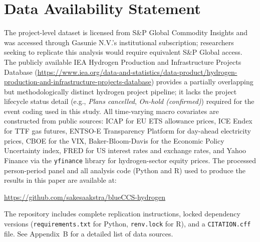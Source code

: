 \documentclass[review,authoryear,11pt]{elsarticle}
\begin{document}
\section*{Data Availability Statement}

The project-level dataset is licensed from S\&P Global Commodity Insights and was accessed through Gasunie N.V.'s institutional subscription; researchers seeking to replicate this analysis would require equivalent S\&P Global access. The publicly available IEA Hydrogen Production and Infrastructure Projects Database (\url{https://www.iea.org/data-and-statistics/data-product/hydrogen-production-and-infrastructure-projects-database}) provides a partially overlapping but methodologically distinct hydrogen project pipeline; it lacks the project lifecycle status detail (e.g., \textit{Plans cancelled}, \textit{On-hold (confirmed)}) required for the event coding used in this study. All time-varying macro covariates are constructed from public sources: ICAP for EU ETS allowance prices, ICE Endex for TTF gas futures, ENTSO-E Transparency Platform for day-ahead electricity prices, CBOE for the VIX, Baker-Bloom-Davis for the Economic Policy Uncertainty index, FRED for US interest rates and exchange rates, and Yahoo Finance via the \texttt{yfinance} library for hydrogen-sector equity prices. The processed person-period panel and all analysis code (Python and R) used to produce the results in this paper are available at:

\begin{center}
\url{https://github.com/sakesaakstra/blueCCS-hydrogen}
\end{center}

The repository includes complete replication instructions, locked dependency versions (\texttt{requirements.txt} for Python, \texttt{renv.lock} for R), and a \texttt{CITATION.cff} file. See Appendix~B for a detailed list of data sources.
\end{document}
